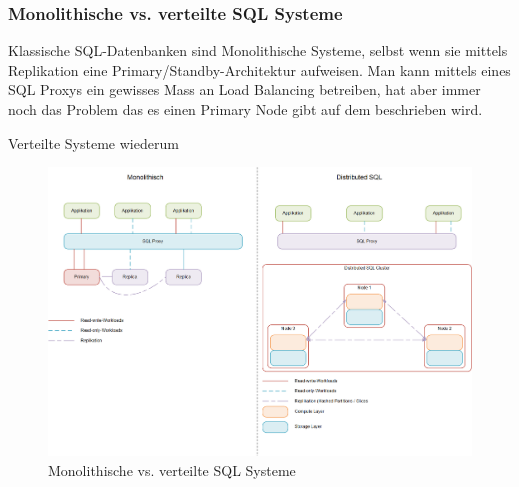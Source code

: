 
\subsubsection{Monolithische vs. verteilte SQL Systeme}
\begin{flushleft}
    Klassische SQL-Datenbanken sind Monolithische Systeme, selbst wenn sie mittels Replikation eine Primary/Standby-Architektur aufweisen.
    Man kann mittels eines SQL Proxys ein gewisses Mass an Load Balancing betreiben, hat aber immer noch das Problem das es einen Primary Node gibt auf dem beschrieben wird.

    Verteilte Systeme wiederum

    \begin{figure}[H]
        \centering
        \includegraphics[width=1\linewidth]{source/implementation/evaluation/excursus_architecture/monolith_distributed}
        \caption{Monolithische vs. verteilte SQL Systeme}
        \label{fig:Monolith_vs_Distributed_SQL}
    \end{figure}
\end{flushleft}
